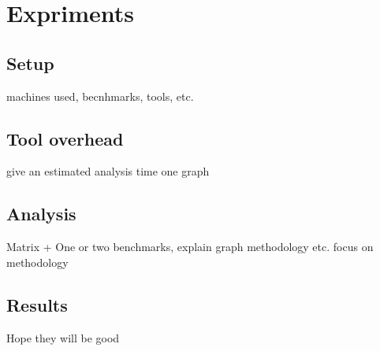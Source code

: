 \section{Expriments}
\label{sec:expe}
\subsection{Setup}
\label{sec:expe-setup}
machines used, becnhmarks, tools, etc.
\subsection{Tool overhead}
\label{sec:expe-overhead}
give an estimated analysis time one graph
\subsection{Analysis}
\label{sec:expe-analysis}
Matrix + One or two benchmarks, explain graph methodology etc.
focus on methodology
\subsection{Results}
\label{sec:expe-results}
Hope they will be good
